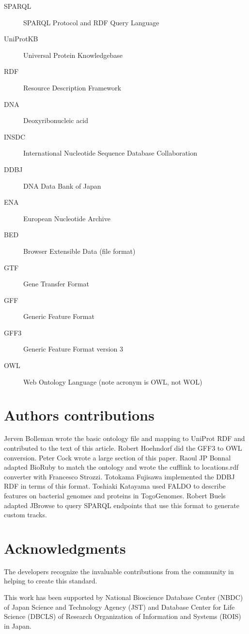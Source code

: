 \documentclass[10pt]{bmc_article}
\newenvironment{bmcformat}{\begin{raggedright}\baselineskip20pt\sloppy\setboolean{publ}{false}}{\end{raggedright}\baselineskip20pt\sloppy}
\begin{document}
\begin{bmcformat}
\begin{description}
\item[SPARQL] SPARQL Protocol and RDF Query Language
\item[UniProtKB] Universal Protein Knowledgebase 
\item[RDF] Resource Description Framework
\item[DNA] Deoxyribonucleic acid
\item[INSDC] International Nucleotide Sequence Database Collaboration
\item[DDBJ] DNA Data Bank of Japan
\item[ENA] European Nucleotide Archive
\item[BED] Browser Extensible Data (file format)
\item[GTF] Gene Transfer Format
\item[GFF] Generic Feature Format
\item[GFF3] Generic Feature Format version 3
\item[OWL] Web Ontology Language (note acronym is OWL, not WOL)
\end{description}
\bigskip

\section*{Authors contributions}

Jerven Bolleman wrote the basic ontology file and mapping to UniProt RDF and contributed to the text of this article.
Robert Hoehndorf did the GFF3 to OWL conversion.
Peter Cock wrote a large section of this paper.
Raoul JP Bonnal adapted BioRuby to match the ontology and wrote the cufflink to locations.rdf converter with Francesco Strozzi.
Totokama Fujisawa implemented the DDBJ RDF in terms of this format.
Toshiaki Katayama used FALDO to describe features on bacterial genomes and proteins in TogoGenomes.
Robert Buels adapted JBrowse to query SPARQL endpoints that use this format to generate custom tracks. 

\section*{Acknowledgments}
The developers recognize the invaluable contributions from the community in helping to create this standard.

This work has been supported by National Bioscience Database Center (NBDC) of Japan Science and Technology Agency (JST) and Database Center for Life Science (DBCLS) of Research Organization of Information and Systems (ROIS) in Japan.


\end{bmcformat}
\end{document}
